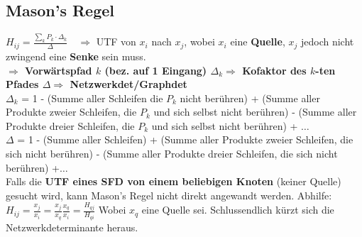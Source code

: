 \subsection{Mason's Regel }
  $\boxed{H_{ij} = \frac{\sum\limits_k P_k\cdot\Delta_k}{\Delta}}\quad
  \Rightarrow$ UTF von $x_i$ nach $x_j$, wobei \textbf{$x_i$} eine
  \textbf{Quelle}, \textbf{$x_j$} jedoch nicht zwingend eine \textbf{Senke} sein
  muss. \vspace{0.3cm}\\
  \textbf{ $\Rightarrow$ Vorwärtspfad $k$ (bez. auf 1 Eingang) \enspace $\Delta_k \Rightarrow$ Kofaktor des
  $k$-ten Pfades \enspace $\Delta \Rightarrow$ Netzwerkdet/Graphdet\vspace{0.3cm}}\\
  \boldmath$\Delta_k$ = 1 - (Summe aller Schleifen die $P_k$ nicht berühren) + (Summe aller Produkte zweier Schleifen, die $P_k$ und sich selbst nicht
  berühren) - (Summe aller Produkte dreier Schleifen, die $P_k$ und sich selbst
  nicht berühren) + \unboldmath $\ldots$\vspace{0.3cm} \\
  \boldmath$\Delta$ = 1 - (Summe aller Schleifen) + (Summe aller Produkte zweier
  Schleifen, die sich nicht berühren) - (Summe
  aller Produkte dreier Schleifen, die sich nicht berühren) +\unboldmath$\ldots$ \\

  Falls die \textbf{UTF eines SFD von einem beliebigen Knoten} (keiner Quelle)
  gesucht wird, kann Mason's Regel nicht direkt angewandt werden. Abhilfe: \\
  $\boxed{H_{ij} = \frac{x_j}{x_i} = \frac{x_j}{x_q} \frac{x_q}{x_i} =
  \frac{H_{qj}}{H_{qi}}}$ Wobei $x_q$ eine Quelle sei. 
  Schlussendlich kürzt sich die Netzwerkdeterminante heraus. \\

